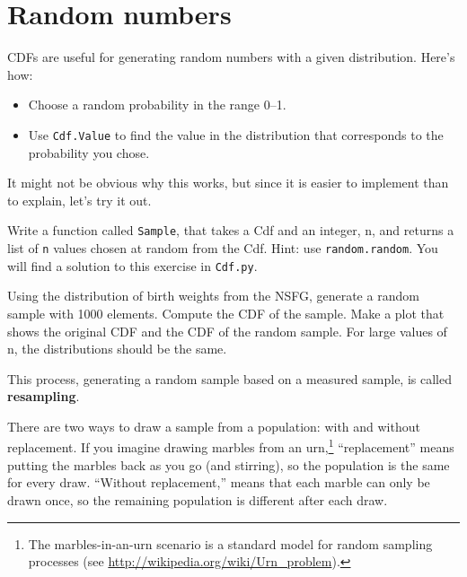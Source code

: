 \documentclass[12pt]{book}
\begin{document}
\section{Random numbers}
\label{random}

CDFs are useful for generating random numbers with a given
distribution.  Here's how:

\begin{itemize}

\item Choose a random probability in the range 0--1.

\item Use {\tt Cdf.Value} to find the value in the distribution
that corresponds to the probability you chose.

\end{itemize}

It might not be obvious why this works, but since it is easier
to implement than to explain, let's try it out.

\begin{exercise}
Write a function called {\tt Sample}, that takes a Cdf and
an integer, n, and returns a list of {\tt n} values chosen at
random from the Cdf.  Hint: use {\tt random.random}.
You will find a solution to this exercise in {\tt Cdf.py}.

Using the distribution of birth weights from the NSFG, generate a
random sample with 1000 elements.  Compute the CDF of the sample.
Make a plot that shows the original CDF and the CDF of the random
sample.  For large values of n, the distributions should be
the same.

\end{exercise}

This process, generating a random sample based on a measured sample,
is called {\bf resampling}.

There are two ways to draw a sample from a population: with and
without replacement.  If you imagine drawing marbles from an
urn,\footnote{The marbles-in-an-urn scenario is a standard model for
  random sampling processes (see
  \url{http://wikipedia.org/wiki/Urn_problem}).} ``replacement'' means
putting the marbles back as you go (and stirring), so the population
is the same for every draw.  ``Without replacement,'' means that each
marble can only be drawn once, so the remaining population is
different after each draw.
\end{document}
